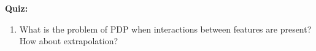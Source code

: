 \textbf{Quiz:}\\ \noindent
\begin{enumerate}
	\item What is the problem of PDP when interactions between features are present? How about extrapolation?
\end{enumerate}
